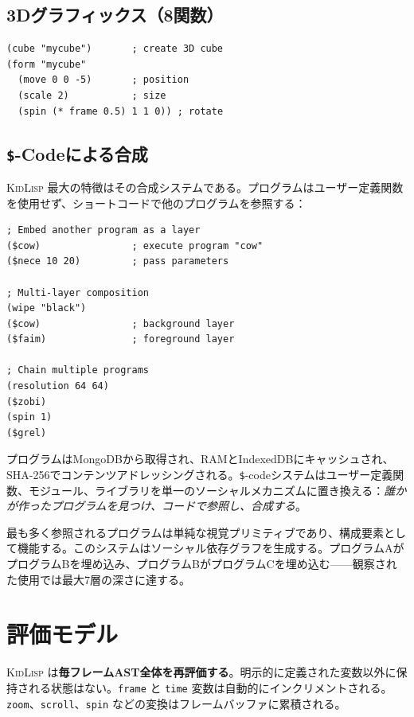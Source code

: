 \documentclass[10pt,letterpaper,twocolumn]{article}
\newcommand{\kl}{\textsc{KidLisp}}
\begin{document}
\subsection{3Dグラフィックス（8関数）}

\begin{lstlisting}
(cube "mycube")       ; create 3D cube
(form "mycube"
  (move 0 0 -5)       ; position
  (scale 2)           ; size
  (spin (* frame 0.5) 1 1 0)) ; rotate
\end{lstlisting}

\subsection{\texttt{\$}-Codeによる合成}

\kl{} 最大の特徴はその合成システムである。プログラムはユーザー定義関数を使用せず、ショートコードで他のプログラムを参照する：

\begin{lstlisting}
; Embed another program as a layer
($cow)                ; execute program "cow"
($nece 10 20)         ; pass parameters

; Multi-layer composition
(wipe "black")
($cow)                ; background layer
($faim)               ; foreground layer

; Chain multiple programs
(resolution 64 64)
($zobi)
(spin 1)
($grel)
\end{lstlisting}

プログラムはMongoDBから取得され、RAMとIndexedDBにキャッシュされ、SHA-256でコンテンツアドレッシングされる。\texttt{\$}-codeシステムはユーザー定義関数、モジュール、ライブラリを単一のソーシャルメカニズムに置き換える：\emph{誰かが作ったプログラムを見つけ、コードで参照し、合成する}。

最も多く参照されるプログラムは単純な視覚プリミティブであり、構成要素として機能する。このシステムはソーシャル依存グラフを生成する。プログラムAがプログラムBを埋め込み、プログラムBがプログラムCを埋め込む——観察された使用では最大7層の深さに達する。

\section{評価モデル}

\kl{} は\textbf{毎フレームAST全体を再評価する}。明示的に定義された変数以外に保持される状態はない。\texttt{frame} と \texttt{time} 変数は自動的にインクリメントされる。\texttt{zoom}、\texttt{scroll}、\texttt{spin} などの変換はフレームバッファに累積される。
\end{document}
